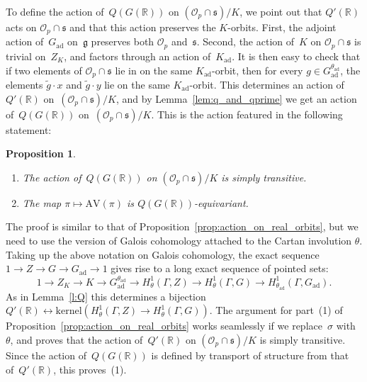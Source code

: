 \documentclass[10pt,leqno]{article}
\newtheorem{proposition}[equation]{Proposition}
\newcommand{\kernel}{\mathrm{kernel}}
\newcommand{\ad}{\mathrm{ad}}
\newcommand{\Gad}{G_\mathrm{ad}}
\newcommand{\Kad}{K_\mathrm{ad}}
\renewcommand{\O}{\mathcal O}
\newcommand{\R}{\mathbb R}
\newcommand{\g}{\mathfrak g}
\newcommand{\s}{\mathfrak s}
\newcommand{\AV}{\mathrm{AV}}
\newcommand{\Op}{\O_p}
\begin{document}
To define the  action of~$Q(G(\R))$ on $(\Op \cap \s)/K$, we point out that $Q'(\R)$ acts on $\Op \cap \s$ and that this action preserves the $K$-orbits. First, the adjoint action of~$\Gad$ on~$\g$ preserves both $\Op$ and~$\s$. Second, the action of~$K$ on $\Op \cap \s$ is trivial on~$Z_K$, and factors through an action of~$\Kad$. It is then easy to check that if two elements of $\Op \cap \s$ lie in on the same $\Kad$-orbit, then for every $g \in \Gad^{\theta_{\ad}}$, the elements  $\tilde{g} \cdot x$ and $\tilde{g} \cdot y$ lie on the same $\Kad$-orbit. This determines an action of~$Q'(\R)$ on~$(\Op \cap \s)/K$, and by Lemma~\ref{lem:q_and_qprime} we get an action of~$Q(G(\R))$ on~$(\Op \cap \s)/K$. This is the action featured in the following statement:


\begin{proposition}\label{prop:action_on_K_orbits}
\begin{enumerate} 
\item The action of~$Q(G(\R))$ on $(\Op \cap \s)/K$ is simply transitive.
\item The map $\pi \mapsto \AV(\pi)$ is $Q(G(\R))$-equivariant.
\end{enumerate}
\end{proposition}

The proof is similar to that of Proposition~\ref{prop:action_on_real_orbits}, but we need to use the version of Galois cohomology attached to the Cartan involution $\theta$. Taking up the above notation on Galois cohomology, the exact sequence $1\rightarrow Z \rightarrow G \rightarrow \Gad\rightarrow 1$ gives rise to a long exact sequence of pointed sets:
\begin{equation} \label{long_ptset_theta}
1\rightarrow Z_K \rightarrow K \rightarrow \Gad^{\theta_{\ad}} \rightarrow H^1_\theta(\Gamma,Z)\rightarrow H^1_\theta(\Gamma,G)\rightarrow H^1_{\theta_{\ad}}(\Gamma,\Gad).
\end{equation}
As in Lemma~\ref{l:Q}  this determines a bijection $Q'(\R) \leftrightarrow \kernel(H^1_\theta(\Gamma,Z)\rightarrow H^1_{\theta}(\Gamma,G))$. The argument for part~(1) of Proposition~\ref{prop:action_on_real_orbits} works seamlessly if we replace~$\sigma$ with~$\theta$, and proves that the action of~$Q'(\R)$ on $(\Op \cap \s)/K$ is simply transitive. Since the action of~$Q(G(\R))$ is defined by transport of structure from that of~$Q'(\R)$, this proves~(1). 
\end{document}
